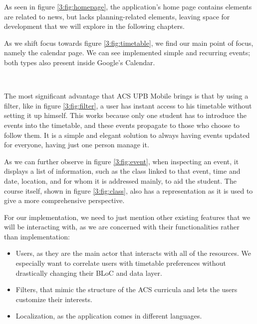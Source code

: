 As seen in figure \ref{3:fig:homepage}, the application’s home page contains elements are related to news, but lacks planning-related elements, leaving space for development that we will explore in the following chapters.

As we shift focus towards figure \ref{3:fig:timetable}, we find our main point of focus, namely the calendar page. We can see implemented simple and recurring events; both types also present inside Google’s Calendar.

~

The most significant advantage that ACS UPB Mobile brings is that by using a filter, like in figure \ref{3:fig:filter}, a user has instant access to his timetable without setting it up himself. This works because only one student has to introduce the events into the timetable, and these events propagate to those who choose to follow them. It is a simple and elegant solution to always having events updated for everyone, having just one person manage it. 

As we can further observe in figure \ref{3:fig:event}, when inspecting an event, it displays a list of information, such as the class linked to that event, time and date, location, and for whom it is addressed mainly, to aid the student. The course itself, shown in figure \ref{3:fig:class},  also has a representation as it is used to give a more comprehensive perspective. 

For our implementation, we need to just mention other existing features that we will be interacting with, as we are concerned with their functionalities rather than implementation: 
\begin{itemize}
            \setlength{\topsep}{0.5pt}
            \setlength{\itemsep}{0.5pt}
            \setlength{\parsep}{0.5pt}
            \item Users, as they are the main actor that interacts with all of the resources. We especially want to correlate users with timetable preferences without drastically changing their BLoC and data layer. 
           \item Filters, that mimic the structure of the ACS curricula and lets the users customize their interests. 
            \item Localization, as the application comes in different languages.
        \end{itemize}


